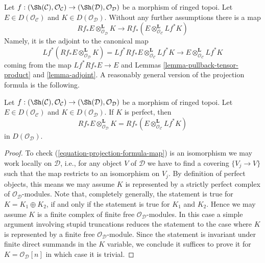 \noindent
Let $f : (\Sh(\mathcal{C}), \mathcal{O}_\mathcal{C}) \to
(\Sh(\mathcal{D}), \mathcal{O}_\mathcal{D})$ be a morphism of ringed topoi.
Let $E \in D(\mathcal{O}_\mathcal{C})$ and $K \in D(\mathcal{O}_\mathcal{D})$.
Without any further assumptions there is a map
\begin{equation}
\label{equation-projection-formula-map}
Rf_*E \otimes^\mathbf{L}_{\mathcal{O}_\mathcal{D}} K
\longrightarrow
Rf_*(E \otimes^\mathbf{L}_{\mathcal{O}_\mathcal{C}} Lf^*K)
\end{equation}
Namely, it is the adjoint to the canonical map
$$
Lf^*(Rf_*E \otimes^\mathbf{L}_{\mathcal{O}_\mathcal{D}} K) =
Lf^*Rf_*E \otimes^\mathbf{L}_{\mathcal{O}_\mathcal{C}} Lf^*K
\longrightarrow
E \otimes^\mathbf{L}_{\mathcal{O}_\mathcal{C}} Lf^*K
$$
coming from the map $Lf^*Rf_*E \to E$ and Lemmas
\ref{lemma-pullback-tensor-product} and \ref{lemma-adjoint}.
A reasonably general version of the projection formula is the following.

\begin{lemma}
\label{lemma-projection-formula}
Let $f : (\Sh(\mathcal{C}), \mathcal{O}_\mathcal{C}) \to
(\Sh(\mathcal{D}), \mathcal{O}_\mathcal{D})$ be a morphism of ringed topoi.
Let $E \in D(\mathcal{O}_\mathcal{C})$ and $K \in D(\mathcal{O}_\mathcal{D})$.
If $K$ is perfect, then
$$
Rf_*E \otimes^\mathbf{L}_{\mathcal{O}_\mathcal{D}} K =
Rf_*(E \otimes^\mathbf{L}_{\mathcal{O}_\mathcal{C}} Lf^*K)
$$
in $D(\mathcal{O}_\mathcal{D})$.
\end{lemma}

\begin{proof}
To check (\ref{equation-projection-formula-map}) is an isomorphism
we may work locally on $\mathcal{D}$, i.e.,
for any object $V$ of $\mathcal{D}$ we have to find a covering $\{V_j \to V\}$
such that the map restricts to an isomorphism on $V_j$. By definition
of perfect objects, this means we may assume $K$ is represented by
a strictly perfect complex of $\mathcal{O}_\mathcal{D}$-modules.
Note that, completely generally, the statement is true for
$K = K_1 \oplus K_2$, if and only if the statement is true for
$K_1$ and $K_2$. Hence we may assume $K$ is a finite
complex of finite free $\mathcal{O}_\mathcal{D}$-modules.
In this case a simple argument involving stupid truncations reduces
the statement to the case where $K$ is represented by a finite
free $\mathcal{O}_\mathcal{D}$-module. Since the statement is invariant
under finite direct summands in the $K$ variable, we conclude
it suffices to prove it for $K = \mathcal{O}_\mathcal{D}[n]$
in which case it is trivial.
\end{proof}

